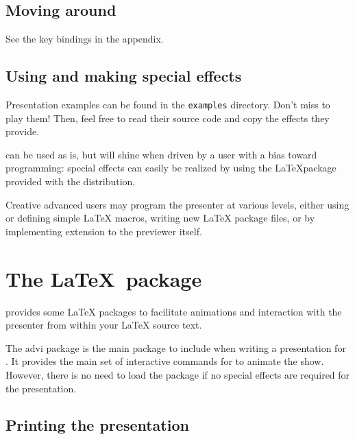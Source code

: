 \documentclass[12pt]{article}
\begin{document}
\subsection {Moving around}

See the key bindings in the appendix.

\subsection {Using and making special effects}

Presentation examples can be found in the 
\verb"examples" directory. Don't miss to play them! Then, feel free
to read their source code and copy the effects they provide.

{\ActiveDVI} can be used as is, but will shine when driven by a user
with a bias toward programming: special effects can easily 
be realized by using the \LaTeX package provided with the distribution. 

Creative advanced users may program the presenter at various levels, either
using or defining simple {\LaTeX} macros, writing new {\LaTeX} package
files, or by implementing extension to the previewer itself.



\section {The  \LaTeX~package}


{\ActiveDVI} provides some {\LaTeX} packages to facilitate animations and
interaction with the presenter from within your {\LaTeX} source text.

The  advi package is the main package to include when writing
a presentation for {\ActiveDVI}. It provides the main set of interactive
commands for {\ActiveDVI} to animate the show. However, there is no
need to load the package if no {\ActiveDVI} special effects are
required for the presentation.

\subsection{Printing the presentation}
\end{document}
